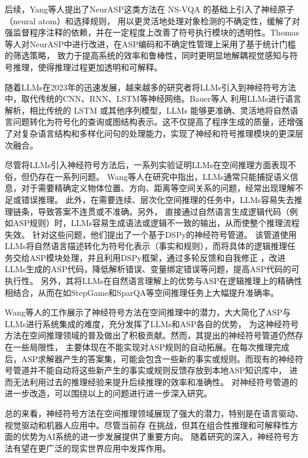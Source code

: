 后续，Yang等人\cite{yang2020neurasp}提出了NeurASP这类方法在 NS-VQA 的基础上引入了神经原子（neural atom）和选择规则，
用以更灵活地处理对象检测的不确定性，缓解了对强监督程序注释的依赖，并在一定程度上改善了符号执行模块的透明性。Thomas等人\cite{eiter2022neuro}对NeurASP中进行改进，在ASP编码和不确定性管理上采用了基于统计门槛的筛选策略，
致力于提高系统的效率和鲁棒性，同时更明显地解耦视觉感知与符号推理，使得推理过程更加透明和可解释。

随着LLMs在2023年的迅速发展，越来越多的研究者将LLMs引入到神经符号方法中，取代传统的CNN、RNN、LSTM等神经网络。Bauer\cite{bauer2023neuro}等人
利用LLMs进行语言解析，相比传统的 LSTM 或其他序列模型，LLMs 能够更准确、灵活地将自然语言问题转化为符号化的查询或图结构表示。这不仅提高了程序生成的质量，还增强了对复杂语言结构和多样化问句的处理能力，实现了神经和符号推理模块的更深层次融合。

尽管将LLMs引入神经符号方法后，一系列实验证明LLMs在空间推理方面表现不俗，但仍存在一系列问题。
Wang等人\cite{wang2024dspy}在研究中指出，LLMs通常只能捕捉语义信息，对于需要精确定义物体位置、方向、距离等空间关系的问题，经常出现理解不足或错误推理。
此外，在需要连续、层次化空间推理的任务中，LLMs容易失去推理链条，导致答案不连贯或不准确。另外，
直接通过自然语言生成逻辑代码（例如ASP规则）时，LLMs容易生成语法或逻辑不一致的输出，从而使整个推理流程失效。
针对这些问题，他们提出了一个基于DSPy的神经符号管道。
该管道使用LLMs将自然语言描述转化为符号化表示（事实和规则），而将具体的逻辑推理任务交给ASP模块处理，并且利用DSPy框架，通过多轮反馈和自我修正
，改进LLMs生成的ASP代码，降低解析错误、变量绑定错误等问题，提高ASP代码的可执行性。
另外，其将LLMs在自然语言理解上的优势与ASP在逻辑推理上的精确性相结合，从而在如StepGame和SparQA等空间推理任务上大幅提升准确率。

Wang等人\cite{wang2024dspy}的工作展示了神经符号方法在空间推理中的潜力，大大简化了ASP与LLMs进行系统集成的难度，充分发挥了LLMs和ASP各自的优势，
为这神经符号方法在空间推理领域的普及做出了积极贡献。然而，其提出的神经符号管道仍然存在一些局限性，
主要体现在不能实现对ASP规则的自动拓展。在每次推理完成后，ASP求解器产生的答案集，可能会包含一些新的事实或规则。而现有的神经符号管道并不能自动将这些新产生的事实或规则反馈存放到本地ASP知识库中，
进而无法利用过去的推理经验来提升后续推理的效率和准确性。
对神经符号管道的进一步改造，可以围绕以上的问题进行进一步深入研究。

总的来看，神经符号方法在空间推理领域展现了强大的潜力，特别是在语言驱动、视觉驱动和机器人应用中。尽管当前存
在挑战，但其在组合性推理和可解释性方面的优势为AI系统的进一步发展提供了重要方向。
随着研究的深入，神经符号方法有望在更广泛的现实世界应用中发挥作用。
